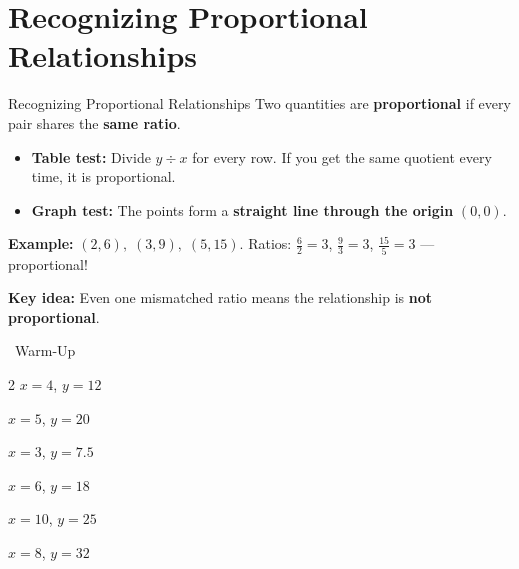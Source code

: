 \section{Recognizing Proportional Relationships}

\begin{quickReview}{Recognizing Proportional Relationships}
Two quantities are \textbf{proportional} if every pair shares the \textbf{same ratio}.

\begin{itemize}[leftmargin=*]
    \item \textbf{Table test:} Divide $y \div x$ for every row. If you get the same quotient every time, it is proportional.
    \item \textbf{Graph test:} The points form a \textbf{straight line through the origin} $(0,0)$.
\end{itemize}

\medskip
\textbf{Example:} $(2, 6),\; (3, 9),\; (5, 15)$. Ratios: $\frac{6}{2}=3$, $\frac{9}{3}=3$, $\frac{15}{5}=3$ — proportional!

\smallskip
\textbf{Key idea:} Even one mismatched ratio means the relationship is \textbf{not proportional}.
\end{quickReview}

\begin{practiceBox}[funGreen]{\faSun~Warm-Up}


\begin{multicols}{2}
\prob $x = 4$, $y = 12$ \answerBlank[2.5cm]

\prob $x = 5$, $y = 20$ \answerBlank[2.5cm]

\prob $x = 3$, $y = 7.5$ \answerBlank[2.5cm]

\prob $x = 6$, $y = 18$ \answerBlank[2.5cm]

\prob $x = 10$, $y = 25$ \answerBlank[2.5cm]

\prob $x = 8$, $y = 32$ \answerBlank[2.5cm]
\end{multicols}
\end{practiceBox}

